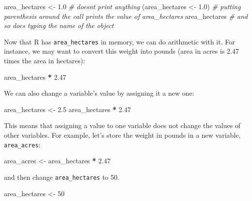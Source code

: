 \documentclass[
]{book}
\newenvironment{Shaded}{\begin{snugshade}}{\end{snugshade}}
\newcommand{\CommentTok}[1]{\textcolor[rgb]{0.56,0.35,0.01}{\textit{#1}}}
\newcommand{\DecValTok}[1]{\textcolor[rgb]{0.00,0.00,0.81}{#1}}
\newcommand{\FloatTok}[1]{\textcolor[rgb]{0.00,0.00,0.81}{#1}}
\newcommand{\NormalTok}[1]{#1}
\newcommand{\OtherTok}[1]{\textcolor[rgb]{0.56,0.35,0.01}{#1}}
\newcommand{\SpecialCharTok}[1]{\textcolor[rgb]{0.81,0.36,0.00}{\textbf{#1}}}
\begin{document}
\begin{Shaded}
\begin{Highlighting}[]
\NormalTok{area\_hectares }\OtherTok{\textless{}{-}} \FloatTok{1.0}    \CommentTok{\# doesn\textquotesingle{}t print anything}
\NormalTok{(area\_hectares }\OtherTok{\textless{}{-}} \FloatTok{1.0}\NormalTok{)  }\CommentTok{\# putting parenthesis around the call prints the value of \textasciigrave{}area\_hectares\textasciigrave{}}
\NormalTok{area\_hectares          }\CommentTok{\# and so does typing the name of the object}
\end{Highlighting}
\end{Shaded}

Now that R has \texttt{area\_hectares} in memory, we can do arithmetic with it. For
instance, we may want to convert this weight into pounds (area in acres is 2.47 times the area in hectares):

\begin{Shaded}
\begin{Highlighting}[]
\NormalTok{area\_hectares  }\SpecialCharTok{*} \FloatTok{2.47}
\end{Highlighting}
\end{Shaded}

We can also change a variable's value by assigning it a new one:

\begin{Shaded}
\begin{Highlighting}[]
\NormalTok{area\_hectares }\OtherTok{\textless{}{-}} \FloatTok{2.5}
\NormalTok{area\_hectares }\SpecialCharTok{*} \FloatTok{2.47}
\end{Highlighting}
\end{Shaded}

This means that assigning a value to one variable does not change the values of
other variables. For example, let's store the weight in pounds in a new
variable, \texttt{area\_acres}:

\begin{Shaded}
\begin{Highlighting}[]
\NormalTok{area\_acres }\OtherTok{\textless{}{-}}\NormalTok{ area\_hectares }\SpecialCharTok{*} \FloatTok{2.47}
\end{Highlighting}
\end{Shaded}

and then change \texttt{area\_hectares} to 50.

\begin{Shaded}
\begin{Highlighting}[]
\NormalTok{area\_hectares }\OtherTok{\textless{}{-}} \DecValTok{50}
\end{Highlighting}
\end{Shaded}
\end{document}
